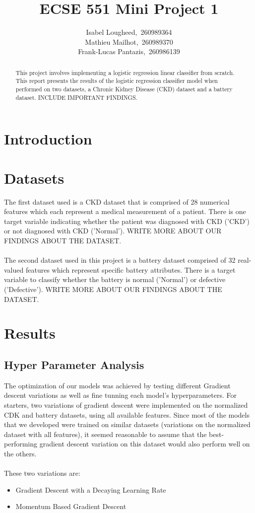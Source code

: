 \documentclass{article}
\title{ECSE 551 Mini Project 1}
\author{
  Isabel Lougheed,~260989364 \\
  \And
  Mathieu Mailhot,~260989370 \\
  \And
  Frank-Lucas Pantazis,~260986139 \\
}
\begin{document}
\maketitle

\begin{abstract}
  This project involves implementing a logistic regression linear classifier from scratch.  This report presents the results of the logistic regression classifier model when performed on two datasets, a Chronic Kidney Disease (CKD) dataset and a battery dataset.  INCLUDE IMPORTANT FINDINGS.
\end{abstract}

\section{Introduction}

\section{Datasets}


The first dataset used is a CKD dataset that is comprised of 28 numerical features which each represent a medical measurement of a patient.  There is one target variable indicating whether the patient was diagnosed with CKD ('CKD') or not diagnosed with CKD ('Normal').  WRITE MORE ABOUT OUR FINDINGS ABOUT THE DATASET.
\\
\\
The second dataset used in this project is a battery dataset comprised of 32 real-valued features which represent specific battery attributes.  There is a target variable to classify whether the battery is normal ('Normal') or defective ('Defective').  WRITE MORE ABOUT OUR FINDINGS ABOUT THE DATASET.


\section{Results}
\subsection{Hyper Parameter Analysis}
The optimization of our models was achieved by testing different Gradient descent variations as well as fine tunning each model’s hyperparameters.
For starters, two variations of gradient descent were implemented on the normalized CDK and battery datasets, using all available features. Since most of the models that we developed were trained on similar datasets (variations on the normalized dataset with all features), it seemed reasonable to assume that the best-performing gradient descent variation on this dataset would also perform well on the others.
\\
\\
These two variations are:
\begin{itemize}
  \item Gradient Descent with a Decaying Learning Rate
  \item Momentum Based Gradient Descent 
\end{itemize}
\end{document}
